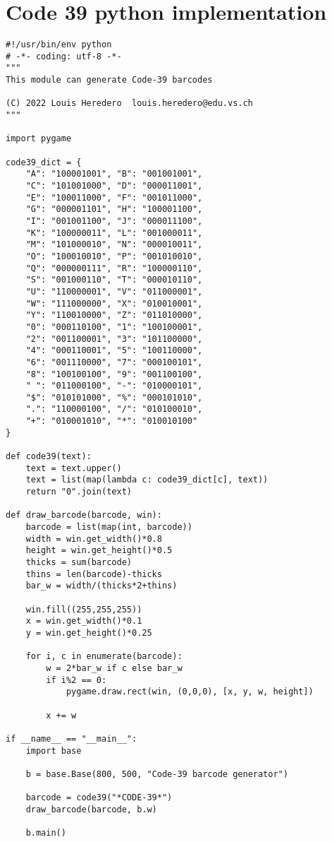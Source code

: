 \chapter{Code 39 python implementation}
\label{app:code39_py}

\begin{tcolorbox}[breakable,colback=white,title=code39.py]
\begin{verbatim}
#!/usr/bin/env python
# -*- coding: utf-8 -*-
"""
This module can generate Code-39 barcodes

(C) 2022 Louis Heredero  louis.heredero@edu.vs.ch
"""

import pygame

code39_dict = {
    "A": "100001001", "B": "001001001",
    "C": "101001000", "D": "000011001",
    "E": "100011000", "F": "001011000",
    "G": "000001101", "H": "100001100",
    "I": "001001100", "J": "000011100",
    "K": "100000011", "L": "001000011",
    "M": "101000010", "N": "000010011",
    "O": "100010010", "P": "001010010",
    "Q": "000000111", "R": "100000110",
    "S": "001000110", "T": "000010110",
    "U": "110000001", "V": "011000001",
    "W": "111000000", "X": "010010001",
    "Y": "110010000", "Z": "011010000",
    "0": "000110100", "1": "100100001",
    "2": "001100001", "3": "101100000",
    "4": "000110001", "5": "100110000",
    "6": "001110000", "7": "000100101",
    "8": "100100100", "9": "001100100",
    " ": "011000100", "-": "010000101",
    "$": "010101000", "%": "000101010",
    ".": "110000100", "/": "010100010",
    "+": "010001010", "*": "010010100"
}

def code39(text):
    text = text.upper()
    text = list(map(lambda c: code39_dict[c], text))
    return "0".join(text)

def draw_barcode(barcode, win):
    barcode = list(map(int, barcode))
    width = win.get_width()*0.8
    height = win.get_height()*0.5
    thicks = sum(barcode)
    thins = len(barcode)-thicks
    bar_w = width/(thicks*2+thins)

    win.fill((255,255,255))
    x = win.get_width()*0.1
    y = win.get_height()*0.25

    for i, c in enumerate(barcode):
        w = 2*bar_w if c else bar_w
        if i%2 == 0:
            pygame.draw.rect(win, (0,0,0), [x, y, w, height])

        x += w

if __name__ == "__main__":
    import base

    b = base.Base(800, 500, "Code-39 barcode generator")

    barcode = code39("*CODE-39*")
    draw_barcode(barcode, b.w)

    b.main()
\end{verbatim}
\end{tcolorbox}

